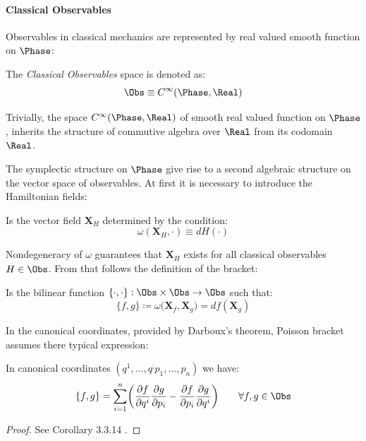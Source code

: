 \documentclass[Main]{subfiles}
\begin{document}
	\paragraph{Classical Observables}
		Observables in classical mechanics are represented by real valued smooth function on $\Phase$:
	\begin{notationfix}
		The \emph{Classical Observables} space is denoted as:
		\begin{displaymath}
			\Obs \equiv		C^\infty(\Phase,\Real)
		\end{displaymath}
	\end{notationfix}
	\begin{observation}
		Trivially, the space  $C^\infty(\Phase,\Real)$ of smooth real valued function on $\Phase$,  inherits the structure of commutive algebra over $\Real$ from its codomain $\Real$.
	\end{observation}
	The symplectic structure on $\Phase$ give rise to a second algebraic structure on the vector space of observables.
	At first it is necessary to introduce the Hamiltonian fields:
	\begin{definition}
		Is the vector field $\mathbf{X}_H$ determined by the condition:
		\begin{displaymath}
			\omega( \mathbf{X}_H,  \cdot )\equiv dH (\cdot)
		\end{displaymath}
	\end{definition}
	Nondegeneracy of $\omega$ guarantees that $\mathbf{X}_H$ exists for all classical observables $H\in \Obs$.
	From that follows the definition of the bracket:
	\begin{definition}
		Is the bilinear function 	$\{\cdot, \cdot\} : \Obs \times \Obs \rightarrow \Obs$ such that:
		\begin{equation}
			\{ f, g \} \coloneqq \omega \big( \mathbf{X}_f , \mathbf{X}_g \big) = df ( \mathbf{X}_g)
		\end{equation}
	\end{definition}	
	
	In the canonical coordinates, provided  by  Darboux's theorem,  Poisson bracket assumes there typical expression:
	\begin{proposition}
	
	In canonical coordinates  $(q^1, \ldots, q^; p_1, \ldots, p_n)$ we have:
	\begin{equation}
		\{f,g\} = \sum_{i=1}^n \biggr(\frac{\partial f}{\partial q^i} \frac{\partial g}{\partial p_i}  - \frac{\partial f}{\partial p_i} \frac{\partial g}{\partial q^i} \biggr) \qquad \forall f,g \in \Obs
	\end{equation}
	\end{proposition}
	\begin{proof}
			See Corollary 3.3.14 \cite{Abraham1978}.
	\end{proof}
\end{document}
